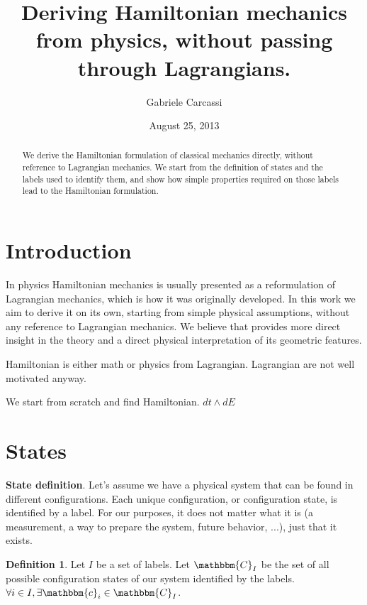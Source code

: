 \documentclass[twocolumn,floatfix,nofootinbib]{revtex4}   %
\theoremstyle{theorem}
\theoremstyle{definition}
\newtheorem{defn}[thm]{Definition}
\begin{document}
\title{Deriving Hamiltonian mechanics from physics, without passing through Lagrangians.}
\author{Gabriele Carcassi}
\date{August 25, 2013}

\begin{abstract}
We derive the Hamiltonian formulation of classical mechanics directly, without reference to Lagrangian mechanics.
We start from the definition of states and the labels used to identify them, and show how simple properties required
on those labels lead to the Hamiltonian formulation.\end{abstract}

\maketitle

\section{Introduction}
In physics Hamiltonian mechanics is usually presented as a reformulation of Lagrangian mechanics, which is how it was originally developed. In this work we aim to derive it on its own, starting from simple physical assumptions, without any reference to Lagrangian mechanics. We believe that provides more direct insight in the theory and a direct physical interpretation of its geometric features.



Hamiltonian is either math or physics from Lagrangian. Lagrangian are not well motivated anyway.

We start from scratch and find Hamiltonian. $dt \wedge dE$

\section{States}
\textbf{State definition}. Let's assume  we have a physical system that can be found in different configurations. Each unique configuration, or configuration state, is identified by a label. For our purposes, it does not matter what it is (a measurement, a way to prepare the system, future behavior, ...), just that it exists.

\begin{defn}\label{statedef}
Let $I$ be a set of labels. Let $\mathbbm{C}_{I}$ be the set of all possible configuration states of our system identified by the labels. $\forall i \in I, \exists \mathbbm{c}_{i} \in \mathbbm{C}_{I}$.
\end{defn}
\end{document}
